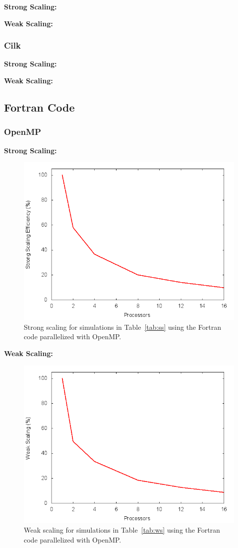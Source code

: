 \documentclass{scrartcl}
\begin{document}
    \textbf{Strong Scaling:}
    
    \textbf{Weak Scaling:}
    
  \subsubsection{Cilk}
  \textbf{Strong Scaling:}
  
  \textbf{Weak Scaling:}
  \subsection{Fortran Code}    
  
  \subsubsection{OpenMP}
  \textbf{Strong Scaling:}
  \begin{figure}
  	\begin{center}
	  	\includegraphics[width=0.7\columnwidth]{./fort_scaling/ss.png}
	  	\caption{Strong scaling for simulations in Table~\ref{tab:ss} using the Fortran code parallelized with OpenMP.}
		\label{fig:ss_fort_omp}
  	\end{center}
  \end{figure}
  
  
  \textbf{Weak Scaling:}  
    \begin{figure}
    	\begin{center}
    		\includegraphics[width=0.7\columnwidth]{./fort_scaling/ws.png}
    		\caption{Weak scaling for simulations in Table~\ref{tab:ws} using the Fortran code parallelized with OpenMP.}
    		\label{fig:ws_fort_omp}
    	\end{center}
    \end{figure}
  
\end{document}
